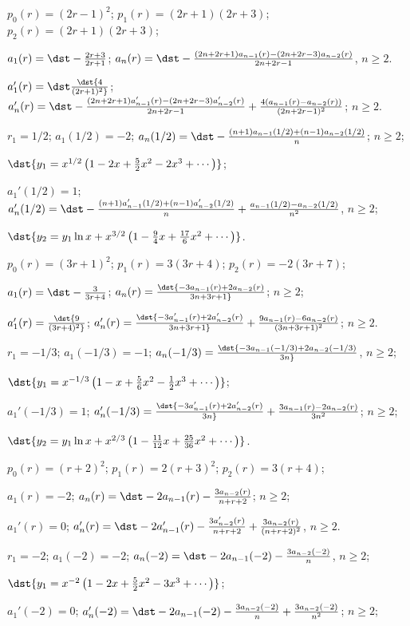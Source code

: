 \documentclass[dvips]{book}
\renewcommand{\exer}[1]{\par\medskip\;\noindent{\color{red}\bf #1.}}
\numberwithin{example}{section}
\numberwithin{equation}{section}
\numberwithin{theorem}{section}
\numberwithin{table}{section}
\numberwithin{figure}{section}
\begin{document}
\exer{7.6.4}
$p_0(r)=(2r-1)^2$;
$p_1(r)=(2r+1)(2r+3)$;
$p_2(r)=(2r+1)(2r+3)$;

$a_1(r)=\dst-{2r+3\over2r+1}$;
$a_n(r)=\dst
-{(2n+2r+1)a_{n-1}(r)-(2n+2r-3)a_{n-2}(r)\over2n+2r-1}$,
$n\ge2$.

$a_1'(r)=\dst\dst{4\over(2r+1)^2}$;
$a_n'(r)=\dst
-{(2n+2r+1)a_{n-1}'(r)-(2n+2r-3)a_{n-2}'(r)\over2n+2r-1}
+{4(a_{n-1}(r)-a_{n-2}(r))\over(2n+2r-1)^2}$;
$n\ge2$.

$r_1=1/2$;
$a_1(1/2)=-2$;
$a_n(1/2)=\dst
-{(n+1)a_{n-1}(1/2)+(n-1)a_{n-2}(1/2)\over n}$;
$n\ge2$;

$\dst{y_1=x^{1/2}\left(1-2x+{5\over2}x^2-2x^3+\cdots\right)}$;

$a_1'(1/2)=1$;
$a_n'(1/2)=\dst
-{(n+1)a_{n-1}'(1/2)+(n-1)a_{n-2}'(1/2)\over n}
+{a_{n-1}(1/2)-a_{n-2}(1/2)\over n^2}$,
$n\ge2$;

$\dst{y_2=
y_1\ln x+x^{3/2}\left(1-{9\over4}x+{17\over6}x^2+
\cdots\right)}$.


\exer{7.6.6}
$p_0(r)=(3r+1)^2$;
$p_1(r)=3(3r+4)$;
$p_2(r)=-2(3r+7)$;

$a_1(r)=\dst-{3\over3r+4}$;
$a_n(r)=\dst
{-3a_{n-1}(r)+2a_{n-2}(r)\over3n+3r+1}$;
$n\ge2$;

$a_1'(r)=\dst{9\over(3r+4)^2}$;
$a_n'(r)=\dst
{-3a_{n-1}'(r)+2a_{n-2}'(r)\over3n+3r+1}
+{9a_{n-1}(r)-6a_{n-2}(r)\over(3n+3r+1)^2}$;
$n\ge2$.

$r_1=-1/3$;
$a_1(-1/3)=-1$;
$a_n(-1/3)=\dst
{-3a_{n-1}(-1/3)+2a_{n-2}(-1/3)\over3n}$,
$n\ge2$;

$\dst{y_1=x^{-1/3}\left(1-x+{5\over6}x^2-{1\over2}x^3+\cdots\right)}$;

$a_1'(-1/3)=1$;
$a_n'(-1/3)=\dst
{-3a_{n-1}'(r)+2a_{n-2}'(r)\over3n}
+{3a_{n-1}(r)-2a_{n-2}(r)\over3n^2}$;
$n\ge2$;

$\dst{y_2=
y_1\ln x+x^{2/3}\left(1-{11\over12}x+{25\over36}x^2+
\cdots\right)}$.


\exer{7.6.8}
$p_0(r)=(r+2)^2$;
$p_1(r)=2(r+3)^2$;
$p_2(r)=3(r+4)$;

$a_1(r)=-2$;
$a_n(r)=\dst
-2a_{n-1}(r)-{3a_{n-2}(r)\over n+r+2}$;
$n\ge2$;


$a_1'(r)=0$;
$a_n'(r)=\dst
-2a_{n-1}'(r)-{3a_{n-2}'(r)\over n+r+2}
+{3a_{n-2}(r)\over(n+r+2)^2}$,
$n\ge2$.

$r_1=-2$;
$a_1(-2)=-2$;
$a_n(-2)=\dst
-2a_{n-1}(-2)-{3a_{n-2}(-2)\over n}$,
$n\ge2$;

$\dst{y_1=x^{-2}\left(1-2x+{5\over2}x^2-3x^3+\cdots\right)}$;

$a_1'(-2)=0$;
$a_n'(-2)=\dst
-2a_{n-1}(-2)-{3a_{n-2}(-2)\over n}+{3a_{n-2}(-2)\over n^2}$;
$n\ge2$;
\end{document}
